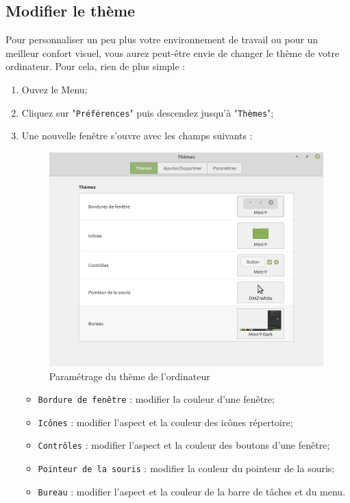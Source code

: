 \documentclass[12pt]{book}
\begin{document}
	\subsection{Modifier le thème}\label{sec:theme}
		 Pour personnaliser un peu plus votre environnement de travail ou pour un meilleur confort visuel, vous aurez peut-être envie de changer le thème de votre ordinateur.
		 Pour cela, rien de plus simple :
		 \begin{enumerate}
		 	\item Ouvez le Menu;
		 	\item Cliquez sur "\texttt{Préférences}" puis descendez jusqu'à "\texttt{Thèmes}";
		 	\item Une nouvelle fenêtre s'ouvre avec les champs suivants :
		 	\begin{figure}[h]
		 		\centering
		 		\includegraphics[width=.8\textwidth]{include/themes.png}
		 		\caption{Paramétrage du thème de l'ordinateur}
		 		\label{fig:themes}
		 	\end{figure}
		 	\begin{itemize}
		 		\item \texttt{Bordure de fenêtre} : modifier la couleur d'une fenêtre;
		 		\item \texttt{Icônes} : modifier l'aspect et la couleur des icônes répertoire;
		 		\item \texttt{Contrôles} : modifier l'aspect et la couleur des boutons d'une fenêtre;
		 		\item \texttt{Pointeur de la souris} : modifier la couleur du pointeur de la souris;
		 		\item \texttt{Bureau} : modifier l'aspect et la couleur de la barre de tâches et du menu.
		 	\end{itemize}
		 \end{enumerate}
\end{document}
